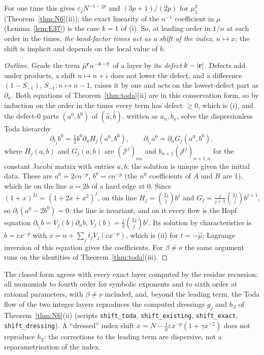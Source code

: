 For one time this gives $\varepsilon_jN^{-1-jp}$ and $(3p+1)/(2p)$ for $\mu_1^2$ (Theorem~\ref{thm:N6}(ii)); the exact linearity of the
$n^{-1}$ coefficient in $\mu$ (Lemma~\ref{lem:E37}) is the case $k=1$ of (i). So, at leading order in $1/n$ at each order in the times,
\emph{the band-factor times act as a shift of the index}, $n\mapsto x$; the shift is implicit and depends on the local value of $b$.

\begin{proof}[Outline]
Grade the term $\hat\mu^{\mathbf r}n^{-k-S}$ of a layer by its \emph{defect} $k-|\mathbf r|$. Defects add under products, a shift $n\mapsto n+i$
does not lower the defect, and a difference $(1-S_{-1})$, $S_{-1}\colon n\mapsto n-1$, raises it by one and acts on the lowest-defect part
as $\partial_n$. Both equations of Theorem~\ref{thm:toda}(ii) are in this conservation form, so by induction on the order in the times
every term has defect $\ge0$, which is (i), and the defect-$0$ parts $(a^0,b^0)$ of $(\hat a,\hat b)$, written as $a_n,b_n$, solve the
dispersionless Toda hierarchy
\[
  \partial_{t_j}b^0=\tfrac12b^0\partial_nH_j(a^0,b^0),\qquad\partial_{t_j}a^0=\partial_nG_j(a^0,b^0),
\]
where $H_j(a,b)$ and $G_j(a,b)$ are $(\mathcal J^j)_{nn}$ and $b_{n+1}(\mathcal J^j)_{n+1,n}$ for the constant Jacobi matrix with entries
$a,b$; the solution is unique given the initial data. These are $a^0=2cn^{-p}$, $b^0=cn^{-p}$ (the $n^0$ coefficients of $A$ and $B$
are $1$), which lie on the line $a=2b$ of a hard edge at $0$. Since $(1+x)^{2j}=(1+2x+x^2)^j$, on this line
$H_j=\binom{2j}jb^j$ and $G_j=\frac j{j+1}\binom{2j}jb^{j+1}$, so $\partial_t(a^0-2b^0)=0$: the line is invariant, and on it every flow is
the Hopf equation $\partial_{t_j}b=V_j(b)\partial_nb$, $V_j(b)=\frac j2\binom{2j}jb^j$. Its solution by characteristics is $b=cx^{-p}$
with $x=n+\sum_jt_jV_j(cx^{-p})$, which is (ii) for $t=-\hat\mu$; Lagrange inversion of this equation gives the coefficients. For $\beta\ne\nu$ the same argument runs on the
identities of Theorem~\ref{thm:toda}(iii).
\end{proof}

The closed form agrees with every exact layer computed by the residue recursion: all monomials to fourth order for symbolic
exponents and to sixth order at rational parameters, with $\beta\ne\nu$ included, and, beyond the leading term, the Toda flow of the two
integer layers reproduces the computed dressings $g_j$ and $h_2$ of Theorem~\ref{thm:N6}(ii) (scripts \texttt{shift\_toda},
\texttt{shift\_existing}, \texttt{shift\_exact}, \texttt{shift\_dressing}). A ``dressed'' index shift $x=N-\frac1p\varepsilon x^{-p}(1+\gamma x^{-2})$
does not reproduce $h_2$: the corrections to the leading term are dispersive, not a reparametrisation of the index.

